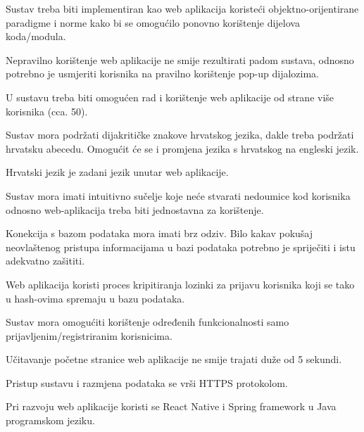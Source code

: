 \begin{packed_item}

	\item Sustav treba biti implementiran kao web aplikacija koristeći objektno-orijentirane paradigme i norme kako bi se omogućilo ponovno korištenje dijelova koda/modula.
	\item Nepravilno korištenje web aplikacije ne smije rezultirati padom sustava, odnosno potrebno je usmjeriti korisnika na pravilno korištenje pop-up dijalozima.
	\item U sustavu treba biti omogućen rad i korištenje web aplikacije od strane više korisnika (cca. 50).
	\item Sustav mora podržati dijakritičke znakove hrvatskog jezika, dakle treba podržati hrvatsku abecedu. Omogućit će se i promjena jezika s hrvatskog na engleski jezik.
	\item Hrvatski jezik je zadani jezik unutar web aplikacije.
	\item Sustav mora imati intuitivno sučelje koje neće stvarati nedoumice kod korisnika odnosno web-aplikacija treba biti jednostavna za korištenje.
	\item Konekcija s bazom podataka mora imati brz odziv. Bilo kakav pokušaj neovlaštenog pristupa informacijama u bazi podataka potrebno je spriječiti i istu adekvatno zašititi.
	\item Web aplikacija koristi proces kripitiranja lozinki za prijavu korisnika koji se tako u hash-ovima spremaju u bazu podataka.
	\item Sustav mora omogućiti korištenje određenih funkcionalnosti samo prijavljenim/registriranim korisnicima.
	\item Učitavanje početne stranice web aplikacije ne smije trajati duže od 5 sekundi.
	\item Pristup sustavu i razmjena podataka se vrši HTTPS protokolom.
	\item Pri razvoju web aplikacije koristi se React Native i Spring framework u Java programskom jeziku.

\end{packed_item}



